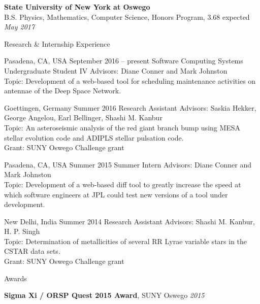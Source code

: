 \documentclass{resume} %
\begin{document}
\textbf{State University of New York at Oswego}
\\
B.S. Physics, Mathematics, Computer Science, Honors Program, 3.68
\hfill
expected \emph{May 2017}

\begin{rSection}{Research \& Internship Experience}{}

           {Pasadena, CA, USA}
           {September 2016 -- present}
           {Software Computing Systems Undergraduate Student IV}
           {
    Advisors:
    Diane Conner and Mark Johnston
    \\
    Topic:
    Development of a web-based tool for scheduling maintenance activities on
    antennae of the Deep Space Network.
  }

           {Goettingen, Germany}
           {Summer 2016}
           {Research Assistant}
           {
    Advisors:
    Saskia Hekker, George Angelou, Earl Bellinger, Shashi M. Kanbur
    \\
    Topic:
    An asteroseismic analysis of the red giant branch bump using MESA stellar
    evolution code and ADIPLS stellar pulsation code.
    \\
    Grant:
    SUNY Oswego Challenge grant
  }

           {Pasadena, CA, USA}
           {Summer 2015}
           {Summer Intern}
           {
    Advisors:
    Diane Conner and Mark Johnston
    \\
    Topic:
    Development of a web-based diff tool to greatly increase the speed at which
    software engineers at JPL could test new versions of a tool under
    development.
  }

           {New Delhi, India}
           {Summer 2014}
           {Research Assistant}
           {
    Advisors:
    Shashi M. Kanbur, H. P. Singh
    \\
    Topic:
    Determination of metallicities of several RR Lyrae variable stars in the
    CSTAR data sets.
    \\
    Grant:
    SUNY Oswego Challenge grant
  }

\end{rSection}

\begin{rSection}{Awards}{}

  \textbf{Sigma Xi / ORSP Quest 2015 Award}, SUNY Oswego
  \hfill
  \emph{2015}

\end{rSection}
\end{document}
